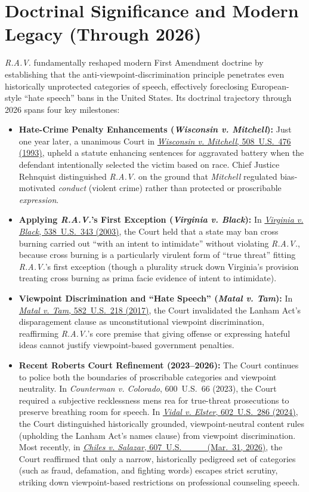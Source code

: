 \documentclass[12pt]{article}
\begin{document}
\section{Doctrinal Significance and Modern Legacy (Through 2026)}
\textit{R.A.V.} fundamentally reshaped modern First Amendment doctrine by establishing that the anti-viewpoint-discrimination principle penetrates even historically unprotected categories of speech, effectively foreclosing European-style ``hate speech'' bans in the United States. Its doctrinal trajectory through 2026 spans four key milestones:
\begin{itemize}
  \item \textbf{Hate-Crime Penalty Enhancements (\textit{Wisconsin v. Mitchell}):} Just one year later, a unanimous Court in \href{https://supreme.justia.com/cases/federal/us/508/476/}{\textit{Wisconsin v. Mitchell}, 508~U.S.~476 (1993)}, upheld a statute enhancing sentences for aggravated battery when the defendant intentionally selected the victim based on race. Chief Justice Rehnquist distinguished \textit{R.A.V.} on the ground that \textit{Mitchell} regulated bias-motivated \textit{conduct} (violent crime) rather than protected or proscribable \textit{expression}.
  \item \textbf{Applying \textit{R.A.V.}'s First Exception (\textit{Virginia v. Black}):} In \href{https://supreme.justia.com/cases/federal/us/538/343/}{\textit{Virginia v. Black}, 538~U.S.~343 (2003)}, the Court held that a state may ban cross burning carried out ``with an intent to intimidate'' without violating \textit{R.A.V.}, because cross burning is a particularly virulent form of ``true threat'' fitting \textit{R.A.V.}'s first exception (though a plurality struck down Virginia's provision treating cross burning as prima facie evidence of intent to intimidate).
  \item \textbf{Viewpoint Discrimination and ``Hate Speech'' (\textit{Matal v. Tam}):} In \href{https://supreme.justia.com/cases/federal/us/582/15-1293/}{\textit{Matal v. Tam}, 582~U.S.~218 (2017)}, the Court invalidated the Lanham Act's disparagement clause as unconstitutional viewpoint discrimination, reaffirming \textit{R.A.V.}'s core premise that giving offense or expressing hateful ideas cannot justify viewpoint-based government penalties.
  \item \textbf{Recent Roberts Court Refinement (2023--2026):} The Court continues to police both the boundaries of proscribable categories and viewpoint neutrality. In \textit{Counterman v. Colorado}, 600~U.S.~66 (2023), the Court required a subjective recklessness mens rea for true-threat prosecutions to preserve breathing room for speech. In \href{https://supreme.justia.com/cases/federal/us/602/22-704/}{\textit{Vidal v. Elster}, 602~U.S.~286 (2024)}, the Court distinguished historically grounded, viewpoint-neutral content rules (upholding the Lanham Act's names clause) from viewpoint discrimination. Most recently, in \href{https://supreme.justia.com/cases/federal/us/607/24-539/}{\textit{Chiles v. Salazar}, 607~U.S.~\_\_\_ (Mar.~31, 2026)}, the Court reaffirmed that only a narrow, historically pedigreed set of categories (such as fraud, defamation, and fighting words) escapes strict scrutiny, striking down viewpoint-based restrictions on professional counseling speech.

\end{itemize}
\end{document}
